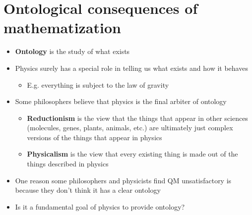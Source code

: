 \documentclass[fleqn]{beamer}
\newcommand{\kw}[1]{\textbf{#1}}
\begin{document}
\section{Ontological consequences of mathematization}

\begin{frame}

\begin{itemize}
\item \kw{Ontology} is the study of what exists
\item Physics surely has a special role in telling us what exists and
  how it behaves
  \begin{itemize}
  \item E.g. everything is subject to the law of gravity
  \end{itemize}
\item Some philosophers believe that physics is the final arbiter of
  ontology
  \begin{itemize}
  \item \kw{Reductionism} is the view that the things that appear in
    other sciences (molecules, genes, plants, animals, etc.) are
    ultimately just complex versions of the things that appear in
    physics
  \item \kw{Physicalism} is the view that every existing thing is made
    out of the things described in physics
  \end{itemize}
\end{itemize}

\end{frame}

\begin{frame}

  \begin{itemize}
  \item One reason some philosophers and physicists find QM
    unsatisfactory is because they don't think it has a clear ontology
  \item Is it a fundamental goal of physics to provide ontology?
  \end{itemize}

\end{frame}
\end{document}

